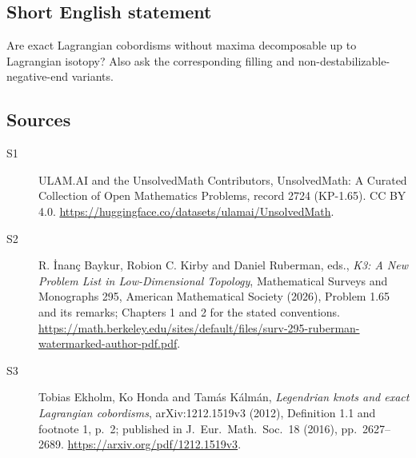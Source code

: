 \documentclass[11pt]{article}
\begin{document}
\subsection{Short English statement}
Are exact Lagrangian cobordisms without maxima decomposable up to Lagrangian isotopy? Also ask the corresponding filling and non-destabilizable-negative-end variants.
\subsection{Sources}
\begin{description}
\item[\hypertarget{source:2724:1}{S1}] ULAM.AI and the UnsolvedMath Contributors, UnsolvedMath: A Curated Collection of Open Mathematics Problems, record 2724 (KP-1.65). CC BY 4.0. \url{https://huggingface.co/datasets/ulamai/UnsolvedMath}.
\item[\hypertarget{source:2724:2}{S2}] R. İnanç Baykur, Robion C. Kirby and Daniel Ruberman, eds., \emph{K3: A New Problem List in Low-Dimensional Topology}, Mathematical Surveys and Monographs 295, American Mathematical Society (2026), Problem 1.65 and its remarks; Chapters 1 and 2 for the stated conventions. \url{https://math.berkeley.edu/sites/default/files/surv-295-ruberman-watermarked-author-pdf.pdf}.
\item[\hypertarget{source:2724:3}{S3}] Tobias Ekholm, Ko Honda and Tamás Kálmán, \emph{Legendrian knots and exact Lagrangian cobordisms}, arXiv:1212.1519v3 (2012), Definition 1.1 and footnote 1, p.\ 2; published in J.\ Eur.\ Math.\ Soc.\ 18 (2016), pp.\ 2627--2689. \url{https://arxiv.org/pdf/1212.1519v3}.
\end{description}
\label{end:2724}
\end{document}
